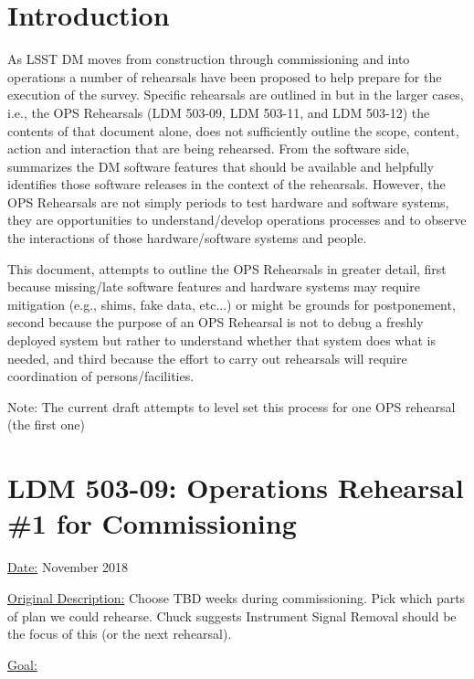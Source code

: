 
\section{Introduction}

As LSST DM moves from construction through commissioning and into operations 
a number of rehearsals have been proposed to help prepare for the execution 
of the survey.  Specific rehearsals are outlined in  but in 
the larger cases, i.e., the OPS Rehearsals (LDM 503-09, LDM 503-11, and 
LDM 503-12) the contents of that document alone, does not sufficiently outline 
the scope, content, action and interaction that are being rehearsed.  
From the software side, 
summarizes the DM software features that should be available and helpfully 
identifies those software releases in the context of the rehearsals.  
However, the OPS Rehearsals are not simply periods to test hardware and 
software systems, they are opportunities to understand/develop operations 
processes and to observe the interactions of those hardware/software systems 
and people. 

This document, attempts to outline the OPS Rehearsals in greater detail, 
first because missing/late software features and hardware systems may 
require mitigation (e.g., shims, fake data, etc...) or might be grounds for 
postponement, second because the purpose of an OPS Rehearsal is not to debug 
a freshly deployed system but rather to understand whether that system does
what is needed, and third because the effort to carry out rehearsals will 
require coordination of persons/facilities. 

Note: The current draft attempts to level set this process for one OPS 
rehearsal (the first one)


\section{LDM 503-09: Operations Rehearsal \#1 for Commissioning}

\underline{Date:} November 2018

\underline{Original Description:}
Choose TBD weeks during commissioning. Pick which parts of plan we could 
rehearse.  Chuck suggests Instrument Signal Removal should be the focus 
of this (or the next rehearsal).

\underline{Goal:}

